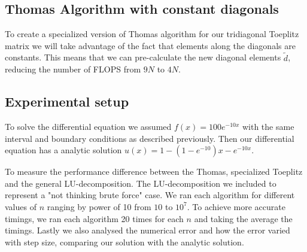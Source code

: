 \subsection*{Thomas Algorithm with constant diagonals}
To create a specialized version of Thomas algorithm for our tridiagonal Toeplitz
matrix we will take
advantage of the fact that elements along the diagonals are constants. This
means that we can pre-calculate the new diagonal elements $\tilde{d}$, reducing
the number of FLOPS from $9N$ to $4N$.

\subsection*{Experimental setup}
To solve the differential equation we assumed $f(x) = 100e^{-10x}$ with the same
interval and boundary conditions as described previously. Then our differential
equation has a analytic solution $u(x) = 1-(1-e^{-10})x -e^{-10x}$. 

To measure the performance difference between the Thomas, specialized
Toeplitz and the general LU-decomposition. The LU-decomposition we included to
represent a "not thinking brute force" case. We ran each algorithm for different
values of $n$ ranging by power of 10 from $10$ to $10^7$. To achieve
more accurate timings, we ran each algorithm 20 times for each $n$ and taking
the average the timings. Lastly we also analysed the numerical error and how
the error varied with step size, comparing our solution with the
analytic solution.
